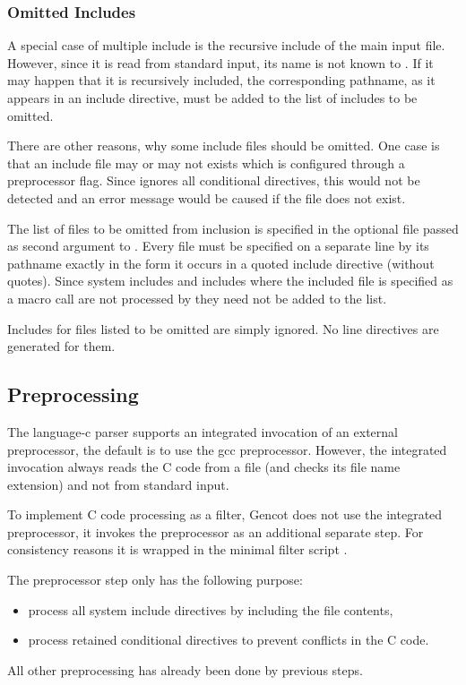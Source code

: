 \subsubsection{Omitted Includes}

A special case of multiple include is the recursive include of the main input file. However, since it is read from standard
input, its name is not known to . If it may happen that it is recursively included, the corresponding
pathname, as it appears in an include directive, must be added to the list of includes to be omitted.

There are other reasons, why some include files should be omitted. One case is that an include file may or may not exists
which is configured through a preprocessor flag. Since  ignores all conditional directives,
this would not be detected and an error message would be caused if the file does not exist.

The list of files to be omitted from inclusion is specified in the optional file passed as second argument to 
. Every file must be specified on a separate line by its pathname exactly in the form it occurs 
in a quoted include directive (without quotes). Since system includes and includes where the included file is specified 
as a macro call are not processed by  they need not be added to the list.

Includes for files listed to be omitted are simply ignored. No line
directives are generated for them.

\subsection{Preprocessing}
\label{impl-ccode-preproc}

The language-c parser supports an integrated invocation of an external preprocessor, the default is to use
the gcc preprocessor. However, the integrated invocation always reads the C code from a file (and checks
its file name extension) and not from standard input.

To implement C code processing as a filter, Gencot does not use the integrated preprocessor,
it invokes the preprocessor as an additional separate step. For consistency reasons it is wrapped in
the minimal filter script . 

The preprocessor step only has the following purpose:
\begin{itemize}
\item process all system include directives by including the file contents,
\item process retained conditional directives to prevent conflicts in the C code.
\end{itemize}
All other preprocessing has already been done by previous steps.

